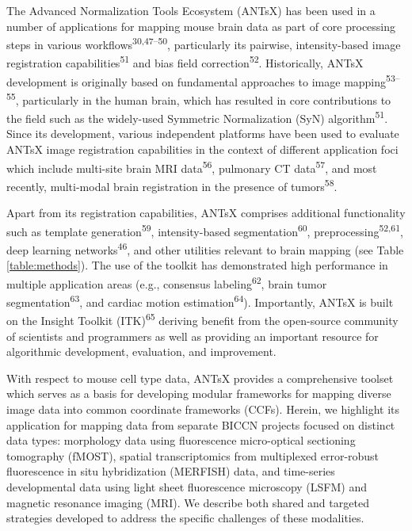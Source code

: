 \documentclass[
  12pt,
]{article}
\begin{document}
The Advanced Normalization Tools Ecosystem (ANTsX) has been used in a
number of applications for mapping mouse brain data as part of core
processing steps in various workflows\textsuperscript{30,47--50},
particularly its pairwise, intensity-based image registration
capabilities\textsuperscript{51} and bias field
correction\textsuperscript{52}. Historically, ANTsX development is
originally based on fundamental approaches to image
mapping\textsuperscript{53--55}, particularly in the human brain, which
has resulted in core contributions to the field such as the widely-used
Symmetric Normalization (SyN) algorithm\textsuperscript{51}. Since its
development, various independent platforms have been used to evaluate
ANTsX image registration capabilities in the context of different
application foci which include multi-site brain MRI
data\textsuperscript{56}, pulmonary CT data\textsuperscript{57}, and
most recently, multi-modal brain registration in the presence of
tumors\textsuperscript{58}.

Apart from its registration capabilities, ANTsX comprises additional
functionality such as template generation\textsuperscript{59},
intensity-based segmentation\textsuperscript{60},
preprocessing\textsuperscript{52,61}, deep learning
networks\textsuperscript{46}, and other utilities relevant to brain
mapping (see Table \ref{table:methods}). The use of the toolkit has
demonstrated high performance in multiple application areas (e.g.,
consensus labeling\textsuperscript{62}, brain tumor
segmentation\textsuperscript{63}, and cardiac motion
estimation\textsuperscript{64}). Importantly, ANTsX is built on the
Insight Toolkit (ITK)\textsuperscript{65} deriving benefit from the
open-source community of scientists and programmers as well as providing
an important resource for algorithmic development, evaluation, and
improvement.

With respect to mouse cell type data, ANTsX provides a comprehensive
toolset which serves as a basis for developing modular frameworks for
mapping diverse image data into common coordinate frameworks (CCFs).
Herein, we highlight its application for mapping data from separate
BICCN projects focused on distinct data types: morphology data using
fluorescence micro-optical sectioning tomography (fMOST), spatial
transcriptomics from multiplexed error-robust fluorescence in situ
hybridization (MERFISH) data, and time-series developmental data using
light sheet fluorescence microscopy (LSFM) and magnetic resonance
imaging (MRI). We describe both shared and targeted strategies developed
to address the specific challenges of these modalities.
\end{document}
